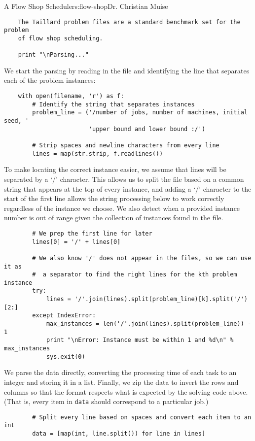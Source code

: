 \begin{aosachapter}{A Flow Shop Scheduler}{s:flow-shop}{Dr. Christian Muise}
\begin{verbatim}
    The Taillard problem files are a standard benchmark set for the problem
    of flow shop scheduling. 

    print "\nParsing..."
\end{verbatim}

We start the parsing by reading in the file and identifying the line
that separates each of the problem instances:

\begin{verbatim}
    with open(filename, 'r') as f:
        # Identify the string that separates instances
        problem_line = ('/number of jobs, number of machines, initial seed, '
                        'upper bound and lower bound :/')

        # Strip spaces and newline characters from every line
        lines = map(str.strip, f.readlines())
\end{verbatim}

To make locating the correct instance easier, we assume that lines will
be separated by a `/' character. This allows us to split the file based
on a common string that appears at the top of every instance, and adding
a `/' character to the start of the first line allows the string
processing below to work correctly regardless of the instance we choose.
We also detect when a provided instance number is out of range given the
collection of instances found in the file.

\begin{verbatim}
        # We prep the first line for later
        lines[0] = '/' + lines[0]

        # We also know '/' does not appear in the files, so we can use it as
        #  a separator to find the right lines for the kth problem instance
        try:
            lines = '/'.join(lines).split(problem_line)[k].split('/')[2:]
        except IndexError:
            max_instances = len('/'.join(lines).split(problem_line)) - 1
            print "\nError: Instance must be within 1 and %d\n" % max_instances
            sys.exit(0)
\end{verbatim}

We parse the data directly, converting the processing time of each task
to an integer and storing it in a list. Finally, we zip the data to
invert the rows and columns so that the format respects what is expected
by the solving code above. (That is, every item in \texttt{data} should
correspond to a particular job.)

\begin{verbatim}
        # Split every line based on spaces and convert each item to an int
        data = [map(int, line.split()) for line in lines]


\end{verbatim}
\end{aosachapter}
